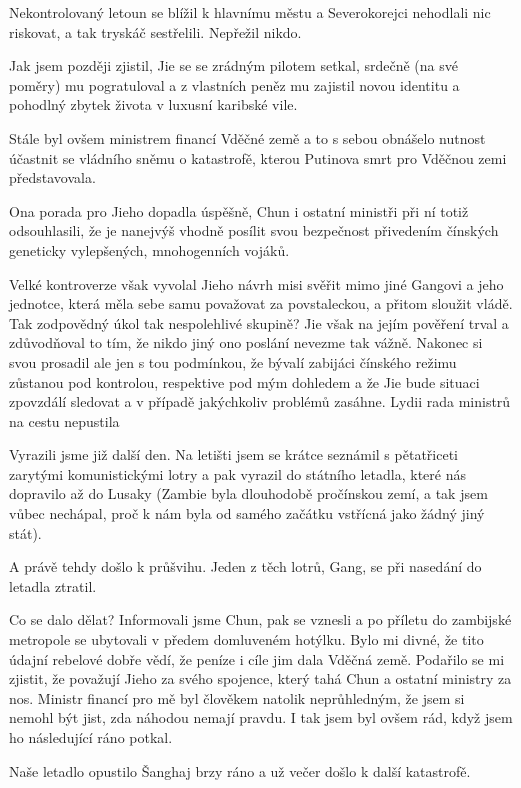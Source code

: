 Nekontrolovaný letoun se blížil k hlavnímu městu a Severokorejci nehodlali nic riskovat, a tak tryskáč sestřelili. Nepřežil nikdo.
\vspace{0.75cm}

Jak jsem později zjistil, Jie se se zrádným pilotem setkal, srdečně (na své poměry) mu pogratuloval a z vlastních peněz mu zajistil novou identitu a pohodlný zbytek života v luxusní karibské vile.

Stále byl ovšem ministrem financí Vděčné země a to s sebou obnášelo nutnost účastnit se vládního sněmu o katastrofě, kterou Putinova smrt pro Vděčnou zemi představovala.
	
Ona porada pro Jieho dopadla úspěšně, Chun i ostatní ministři při ní totiž odsouhlasili, že je nanejvýš vhodně posílit svou bezpečnost přivedením čínských geneticky vylepšených, mnohogenních vojáků.

Velké kontroverze však vyvolal Jieho návrh misi svěřit mimo jiné Gangovi a jeho jednotce, která měla sebe samu považovat za povstaleckou, a přitom sloužit vládě. Tak zodpovědný úkol tak nespolehlivé skupině? Jie však na jejím pověření trval a zdůvodňoval to tím, že nikdo jiný ono poslání nevezme tak vážně. Nakonec si svou prosadil ale jen s tou podmínkou, že bývalí zabijáci čínského režimu zůstanou pod kontrolou, respektive pod mým dohledem a že Jie bude situaci zpovzdálí sledovat a v případě jakýchkoliv problémů zasáhne. Lydii rada ministrů na cestu nepustila

Vyrazili jsme již další den. Na letišti jsem se krátce seznámil s pětatřiceti zarytými komunistickými lotry a pak vyrazil do státního letadla, které nás dopravilo až do Lusaky (Zambie byla dlouhodobě pročínskou zemí, a tak jsem vůbec nechápal, proč k nám byla od samého začátku vstřícná jako žádný jiný stát). 

A právě tehdy došlo k průšvihu. Jeden z těch lotrů, Gang, se při nasedání do letadla ztratil.

Co se dalo dělat? Informovali jsme Chun, pak se vznesli a po příletu do zambijské metropole se ubytovali v předem domluveném hotýlku. Bylo mi divné, že tito údajní rebelové dobře vědí, že peníze i cíle jim dala Vděčná země. Podařilo se mi zjistit, že považují Jieho za svého spojence, který tahá Chun a ostatní ministry za nos. Ministr financí pro mě byl člověkem natolik neprůhledným, že jsem si nemohl být jist, zda náhodou nemají pravdu. I tak jsem byl ovšem rád, když jsem ho následující ráno potkal.

Naše letadlo opustilo Šanghaj brzy ráno a už večer došlo k další katastrofě. 

